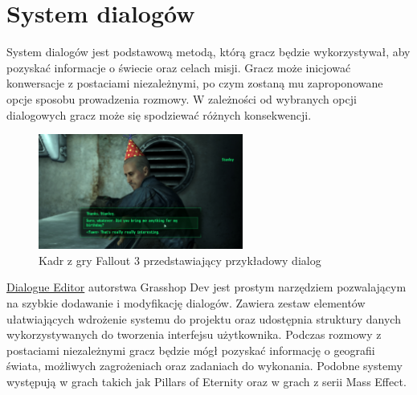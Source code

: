 \chapter{System dialogów}

System dialogów jest podstawową metodą, którą gracz będzie wykorzystywał, aby pozyskać informacje  o świecie oraz celach misji.
Gracz może inicjować konwersacje z postaciami niezależnymi, po czym zostaną mu zaproponowane opcje sposobu prowadzenia rozmowy.
W zależności od wybranych opcji dialogowych gracz może się spodziewać różnych konsekwencji.


\begin{figure}[h]
\centering
\includegraphics[width=0.6\textwidth]{images/fallout3}
\caption{Kadr z gry Fallout 3 przedstawiający przykładowy dialog}
\end{figure}

\href{https://assetstore.unity.com/packages/tools/utilities/dialogue-editor-168329}{Dialogue Editor} autorstwa Grasshop Dev jest prostym narzędziem pozwalającym na szybkie dodawanie i modyfikację dialogów.
Zawiera zestaw elementów ułatwiających wdrożenie systemu do projektu oraz udostępnia struktury danych wykorzystywanych do tworzenia interfejsu użytkownika.
Podczas rozmowy z postaciami niezależnymi gracz będzie mógł pozyskać informację o geografii świata, możliwych zagrożeniach oraz zadaniach do wykonania. 
Podobne systemy występują w grach takich jak Pillars of Eternity oraz w grach z serii Mass Effect.

